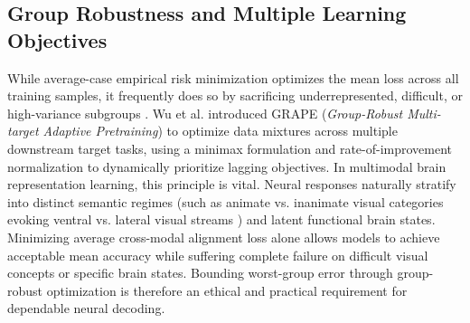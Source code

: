 \documentclass[conference]{IEEEtran}
\begin{document}
\subsection{Group Robustness and Multiple Learning Objectives}
While average-case empirical risk minimization optimizes the mean loss across all training samples, it frequently does so by sacrificing underrepresented, difficult, or high-variance subgroups \cite{sagawa2020groupdro}. Wu et al. introduced GRAPE (\emph{Group-Robust Multi-target Adaptive Pretraining}) \cite{wu2025grape} to optimize data mixtures across multiple downstream target tasks, using a minimax formulation and rate-of-improvement normalization to dynamically prioritize lagging objectives. In multimodal brain representation learning, this principle is vital. Neural responses naturally stratify into distinct semantic regimes (such as animate vs. inanimate visual categories evoking ventral vs. lateral visual streams \cite{hebart2023thingsdata}) and latent functional brain states. Minimizing average cross-modal alignment loss alone allows models to achieve acceptable mean accuracy while suffering complete failure on difficult visual concepts or specific brain states. Bounding worst-group error through group-robust optimization is therefore an ethical and practical requirement for dependable neural decoding.
\end{document}
